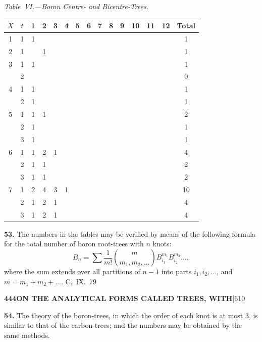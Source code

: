 \documentclass[11pt,a4paper]{article}
\begin{document}
{\textit{Table~VI.---Boron Centre- and Bicentre-Trees.}
\begin{center}
\small
\begin{longtable}{|c|c|c|c|c|c|c|c|c|c|c|c|c|c|c|}
\hline
$X$ & $t$ & 1 & 2 & 3 & 4 & 5 & 6 & 7 & 8 & 9 & 10 & 11 & 12 & Total \\
\hline
\endfirsthead
1 & 1 & 1 & & & & & & & & & & & & 1 \\
\hline
2 & 1 & & 1 & & & & & & & & & & & 1 \\
\hline
3 & 1 & 1 & & & & & & & & & & & & 1 \\
  & 2 & & & & & & & & & & & & & 0 \\
\hline
4 & 1 & 1 & & & & & & & & & & & & 1 \\
  & 2 & 1 & & & & & & & & & & & & 1 \\
\hline
5 & 1 & 1 & 1 & & & & & & & & & & & 2 \\
  & 2 & 1 & & & & & & & & & & & & 1 \\
  & 3 & 1 & & & & & & & & & & & & 1 \\
\hline
6 & 1 & 1 & 2 & 1 & & & & & & & & & & 4 \\
  & 2 & 1 & 1 & & & & & & & & & & & 2 \\
  & 3 & 1 & 1 & & & & & & & & & & & 2 \\
\hline
7 & 1 & 2 & 4 & 3 & 1 & & & & & & & & & 10 \\
  & 2 & 1 & 2 & 1 & & & & & & & & & & 4 \\
  & 3 & 1 & 2 & 1 & & & & & & & & & & 4 \\
\hline
\end{longtable}
\end{center}

\medskip
\noindent\textbf{53.}
The numbers in the tables may be verified by means of the following formula for the total number of boron root-trees with $n$ knots:
\[
B_n = \sum \frac{1}{m!} \binom{m}{m_1, m_2, \ldots} B_{i_1}^{m_1} B_{i_2}^{m_2} \ldots,
\]
where the sum extends over all partitions of $n-1$ into parts $i_1, i_2, \ldots$, and $m = m_1 + m_2 + \ldots$.
\hfill C.~IX.\ 79

\newpage
\noindent\textbf{444}\hspace{\fill}\textbf{ON THE ANALYTICAL FORMS CALLED TREES, WITH}\hspace{\fill}[610

\noindent\textbf{54.}
The theory of the boron-trees, in which the order of each knot is at most 3, is similar to that of the carbon-trees; and the numbers may be obtained by the same methods.

}
\end{document}
